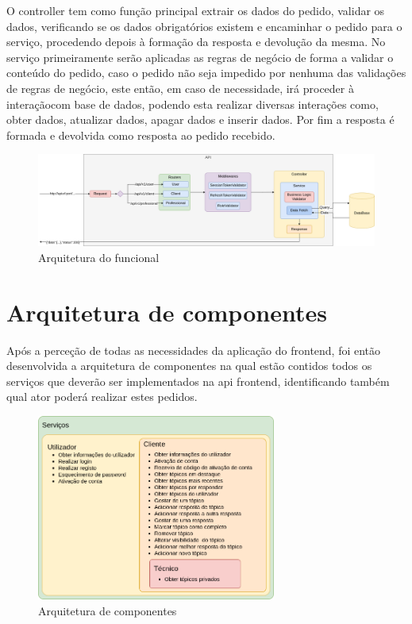 O controller tem como função principal extrair os dados do pedido, validar os dados, verificando se os dados obrigatórios existem e encaminhar o pedido para o serviço, procedendo depois à formação da resposta e devolução da mesma. No serviço primeiramente serão aplicadas as regras de negócio de forma a validar o conteúdo do pedido, caso o pedido não seja impedido por nenhuma das validações de regras de negócio, este então, em caso de necessidade, irá proceder à interaçãocom base de dados, podendo esta realizar diversas interações como, obter dados, atualizar dados, apagar dados e inserir dados. Por fim a resposta é formada e devolvida como resposta ao pedido recebido.

\begin{figure}[htb]
    \centering
    \includegraphics[width=\textwidth]{images/Arquiteturas/arquitetura_funcional.png}
    \caption{Arquitetura do funcional}
    \label{fig:3}
\end{figure}

\newpage

\section{Arquitetura de componentes}
Após a perceção de todas as necessidades da aplicação do frontend, foi então desenvolvida a arquitetura de componentes na qual estão contidos todos os serviços que deverão ser implementados na api frontend, identificando também qual ator poderá realizar estes pedidos.

\begin{figure}[htb]
    \centering
    
    \includegraphics[width=0.7\textwidth]{images/Arquiteturas/arquitetura_de_componentes_final.png}
    \caption{Arquitetura de componentes}
    \label{fig:4}
\end{figure}


